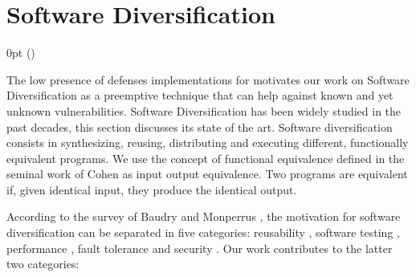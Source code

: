 \section{Software Diversification}
\label{sota:sota}
\def\checkmark{\tikz\fill[scale=0.4](0,.35) -- (.25,0) -- (1,.7) -- (.25,.15) -- cycle;} 

  {\topsep}%
  {\topsep}%
  {\itshape}%
  {0pt}%
  {\bfseries}%
  {}%
  { }%
  {()\textnormal{}}

\def\Gnospace~{G{}}
\theoremstyle{sota}
\newtheorem{goal}{G}
\providecommand*{\definitionautorefname}{\Gnospace}
\newcommand{\goalautorefname}{\Gnospace}


\def\Snospace~{S{}}
\theoremstyle{sota}
\newtheorem{strategy}{S}
\providecommand*{\definitionautorefname}{\Snospace}
\newcommand{\strategyautorefname}{\Snospace}

\def\Unospace~{U{}}
\theoremstyle{sota}
\newtheorem{usage}{U}
\providecommand*{\definitionautorefname}{\Unospace}
\newcommand{\usageautorefname}{\Unospace}

The low presence of defenses implementations for \wasm motivates our work on Software Diversification as a preemptive technique that can help against known and yet unknown vulnerabilities.
Software Diversification has been widely studied in the past decades, this section discusses its state of the art.
Software diversification consists in synthesizing, reusing, distributing and executing different, functionally equivalent programs. We use the concept of functional equivalence defined in the seminal work of Cohen \etal \cite{cohen1993operating} as input output equivalence. Two programs are equivalent if, given identical input, they produce the identical output.

According to the survey of Baudry and Monperrus \cite{natural_diversity}, the motivation for software diversification can be separated in five categories: reusability \cite{pohl2005software}, software testing \cite{Chen2010AdaptiveRT}, performance \cite{10.1145/2025113.2025133}, fault tolerance \cite{1659219} and security \cite{cohen1993operating}. Our work contributes to the latter two categories: 


